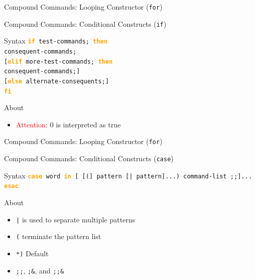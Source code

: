 \documentclass[10pt, compress, aspectratio=169]{beamer}
\begin{document}
\begin{frame}{Compound Commands: Looping Constructor (\texttt{for})}
  
  
\end{frame}

\begin{frame}{Compound Commands: Conditional Constructs (\texttt{if})}
  \begin{alertblock}{Syntax}
    \texttt{\textbf{\textcolor{orange}{if}} test-commands; 
            \textbf{\textcolor{orange}{then}} \\
            consequent-commands;\\
            {[}\textbf{\textcolor{orange}{elif}} more-test-commands;
               \textbf{\textcolor{orange}{then}} \\
            consequent-commands;{]} \\
            {[}\textbf{\textcolor{orange}{else}} alternate-consequents;{]} \\
            \textbf{\textcolor{orange}{fi}}
            }
  \end{alertblock}
  \begin{exampleblock}{About}
    \begin{itemize}
      \item \textcolor{red}{Attention}: 0 is interpreted as true
    \end{itemize}
  \end{exampleblock}
\end{frame}

\begin{frame}{Compound Commands: Looping Constructor (\texttt{for})}
  
\end{frame}

\begin{frame}{Compound Commands: Conditional Constructs (\texttt{case})}
  \begin{alertblock}{Syntax}
    \texttt{\textbf{\textcolor{orange}{case}} word
            \textbf{\textcolor{orange}{in}}
            {[} {[}({]} pattern {[}| pattern{]}...) command-list ;;{]}... 
            \textbf{\textcolor{orange}{esac}}
            }
  \end{alertblock}
  \begin{exampleblock}{About}
    \begin{itemize}
      \item \texttt{|} is used to separate multiple patterns
      \item \texttt{(} terminate the pattern list
      \item \texttt{*)} Default
        \item \texttt{;;}, \texttt{;\&}, and \texttt{;;\&} 
    \end{itemize}
  \end{exampleblock}
\end{frame}
\end{document}
